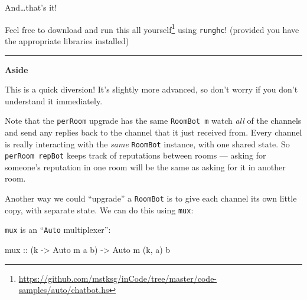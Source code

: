 \documentclass[]{article}
\newenvironment{Shaded}{}{}
\newcommand{\CommentTok}[1]{\textcolor[rgb]{0.38,0.63,0.69}{\textit{#1}}}
\newcommand{\DataTypeTok}[1]{\textcolor[rgb]{0.56,0.13,0.00}{#1}}
\newcommand{\FunctionTok}[1]{\textcolor[rgb]{0.02,0.16,0.49}{#1}}
\newcommand{\KeywordTok}[1]{\textcolor[rgb]{0.00,0.44,0.13}{\textbf{#1}}}
\newcommand{\NormalTok}[1]{#1}
\newcommand{\OperatorTok}[1]{\textcolor[rgb]{0.40,0.40,0.40}{#1}}
\newcommand{\OtherTok}[1]{\textcolor[rgb]{0.00,0.44,0.13}{#1}}
\renewcommand{\href}[2]{#2\footnote{\url{#1}}}
\begin{document}
And\ldots that's it!

Feel free to
\href{https://github.com/mstksg/inCode/tree/master/code-samples/auto/chatbot.hs}{download
and run this all yourself} using \texttt{runghc}! (provided you have the
appropriate libraries installed)

\begin{center}\rule{0.5\linewidth}{0.5pt}\end{center}

\textbf{Aside}

This is a quick diversion! It's slightly more advanced, so don't worry if you
don't understand it immediately.

Note that the \texttt{perRoom} upgrade has the same \texttt{RoomBot\ m} watch
\emph{all} of the channels and send any replies back to the channel that it just
received from. Every channel is really interacting with the \emph{same}
\texttt{RoomBot} instance, with one shared state. So \texttt{perRoom\ repBot}
keeps track of reputations between rooms --- asking for someone's reputation in
one room will be the same as asking for it in another room.

Another way we could ``upgrade'' a \texttt{RoomBot} is to give each channel its
own little copy, with separate state. We can do this using \texttt{mux}:

\begin{Shaded}
\end{Shaded}

\texttt{mux} is an ``\texttt{Auto} multiplexer'':

\begin{Shaded}
\begin{Highlighting}[]
\OtherTok{mux ::}\NormalTok{ (k }\OtherTok{{-}\textgreater{}} \DataTypeTok{Auto}\NormalTok{ m a b) }\OtherTok{{-}\textgreater{}} \DataTypeTok{Auto}\NormalTok{ m (k, a) b}
\end{Highlighting}
\end{Shaded}
\end{document}
